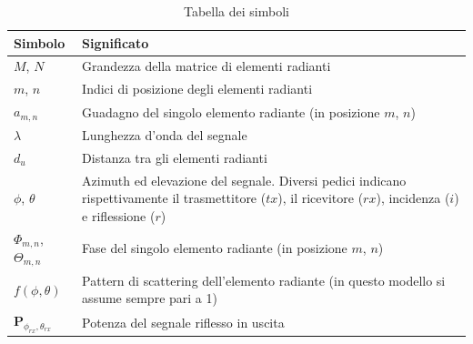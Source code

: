\begin{table}
  \centering
  \begin{tabular}{p{}p{}}
    \hline
    \textbf{Simbolo}                     & \textbf{Significato}                                                                                                                                          \\
    \hline
    $M$, $N$                             & Grandezza della matrice di elementi radianti                                                                                                                  \\
    $m$, $n$                             & Indici di posizione degli elementi radianti                                                                                                                   \\
    $a_{m,n}$                            & Guadagno del singolo elemento radiante (in posizione $m$, $n$)                                                                                                \\
    $\lambda$                            & Lunghezza d'onda del segnale                                                                                                                                  \\
    $d_{u}$                              & Distanza tra gli elementi radianti                                                                                                                            \\
    $\phi$, $\theta$                     & Azimuth ed elevazione del segnale. Diversi pedici indicano rispettivamente il trasmettitore ($tx$), il ricevitore ($rx$), incidenza ($i$) e riflessione ($r$) \\
    $\Phi_{m,n}$, $\Theta_{m,n}$         & Fase del singolo elemento radiante (in posizione $m$, $n$)                                                                                                    \\
    $f(\phi, \theta)$                    & Pattern di scattering dell'elemento radiante (in questo modello si assume sempre pari a 1)                                                                    \\
    $\textbf{P}_{\phi_{rx},\theta_{rx}}$ & Potenza del segnale riflesso in uscita                                                                                                                        \\
    \hline
  \end{tabular}
  \caption{Tabella dei simboli}
  \label{tab:symbols}
\end{table}

